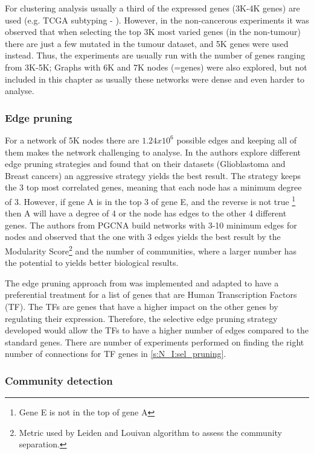 For clustering analysis usually a third of the expressed genes (3K-4K genes) are used (e.g. TCGA subtyping - \citet{Robertson2017-mg}). However, in the non-cancerous experiments it was observed that when selecting the top 3K most varied genes (in the non-tumour) there are just a few mutated in the tumour dataset, and 5K genes were used instead. Thus, the experiments are usually run with the number of genes ranging from 3K-5K; Graphs with 6K and 7K nodes (=genes) were also explored, but not included in this chapter as usually these networks were dense and even harder to analyse.

\subsubsection{Edge pruning}
For a network of 5K nodes there are $1.24x10^6$ possible edges and keeping all of them makes the network challenging to analyse. In \citet{Care2019-ij} the authors explore different edge pruning strategies and found that on their datasets (Glioblastoma and Breast cancers) an aggressive strategy yields the best result. The strategy keeps the 3 top most correlated genes, meaning that each node has a minimum degree of 3. However, if gene A is in the top 3 of gene E, and the reverse is not true \footnote{Gene E is not in the top of gene A} then A will have a degree of 4 or the node has edges to the other 4 different genes. The authors from PGCNA build networks with 3-10 minimum edges for nodes and observed that the one with 3 edges yields the best result by the Modularity Score\footnote{Metric used by Leiden and Louivan algorithm to assess the community separation.} and the number of communities, where a larger number has the potential to yields better biological results.

The edge pruning approach from \citet{Care2019-ij} was implemented and adapted to have a preferential treatment for a list of genes that are Human Transcription Factors \cite{Lambert2018-el} (TF). The TFs are genes that have a higher impact on the other genes by regulating their expression. Therefore, the selective edge pruning strategy developed would allow the TFs to have a higher number of edges compared to the standard genes. There are number of experiments performed on finding the right number of connections for TF genes in \cref{s:N_I:sel_pruning}.

\subsubsection{Community detection}

